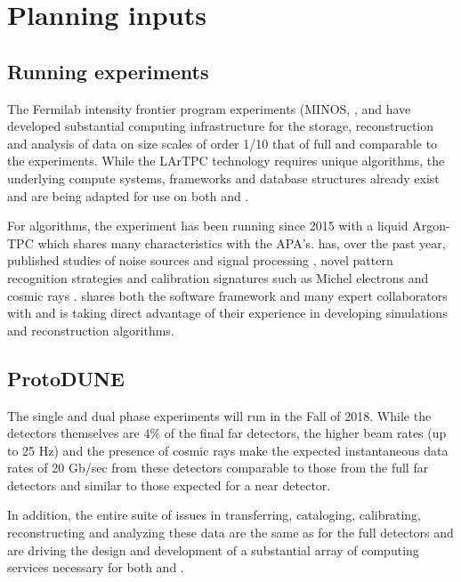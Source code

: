  
\section{Planning inputs}


\subsection{Running experiments}\label{sw:IF-input}

The Fermilab intensity frontier program experiments (MINOS\cite{minos},  \cite{minerva}, \cite{microboone} and  \cite{nova} have developed substantial computing infrastructure for the storage, reconstruction and analysis of data on size scales of order 1/10 that of full   and comparable to the  experiments. While the LArTPC technology requires unique algorithms, the underlying compute systems, frameworks and database structures already exist and are being adapted for use on both  and  .

For algorithms, the  \cite{Acciarri:2016smi} experiment has been running since 2015 with a liquid Argon-TPC which shares many characteristics with the   APA's.     has, over the past year, published studies of noise sources and signal processing \cite{Acciarri:2017sde,Adams:2018dra}, novel pattern recognition strategies \cite{Acciarri:2016ryt,Acciarri:2017hat} and calibration signatures such as Michel electrons and cosmic rays \cite{Acciarri:2017sjy,Acciarri:2017sde}.    shares both the \larsoft software framework and many expert collaborators with   and is taking direct advantage of their experience in developing simulations and reconstruction algorithms.


\subsection{ProtoDUNE}\label{sw:PD-planning}

The  single and dual phase experiments will run in the Fall of 2018.  While the detectors themselves are 4\% of the final far detectors, the higher beam rates (up to 25 Hz) and the presence of cosmic rays make the expected instantaneous data rates of 20 Gb/sec from these detectors comparable to those from the full far detectors and similar to those expected for a near detector. 

In addition, the entire suite of issues in transferring, cataloging, calibrating, reconstructing and analyzing these data are the same as for the full detectors and are driving the design and development of a substantial array of computing services necessary for both  and  .

